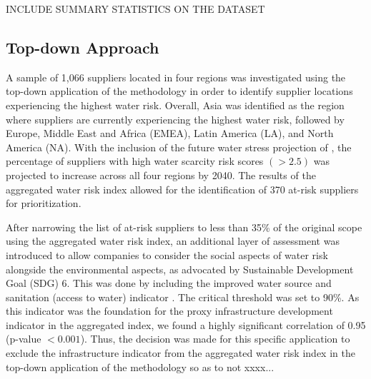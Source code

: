 \documentclass[a4paper]{article}
\begin{document}
 INCLUDE SUMMARY STATISTICS ON THE DATASET
 
\subsection{Top-down Approach}
A sample of 1,066 suppliers located in four regions was investigated using the top-down application of the methodology in order to identify supplier locations experiencing the highest water risk. 
Overall, Asia was identified as the region where suppliers are currently experiencing the highest water risk, followed by Europe, Middle East and Africa (EMEA), Latin America (LA), and North America (NA).
 With the inclusion of the future water stress projection of \citet{Luck:2015}, the percentage of suppliers with high water scarcity risk scores $(>2.5)$ was projected to increase across all four regions by 2040. 
 The results of the aggregated water risk index allowed for the identification of 370 at-risk suppliers for prioritization. 
 
After narrowing the list of at-risk suppliers to less than 35\% of the original scope using the aggregated water risk index, an additional layer of assessment was introduced to allow companies to consider the social aspects of water risk alongside the environmental aspects, as advocated by Sustainable Development Goal (SDG) 6.  
This was done by including the improved water source and sanitation (access to water) indicator \citep{WHO:2016}. 
The critical threshold was set to 90\%.  
As this indicator was the foundation for the proxy infrastructure development indicator in the aggregated index, we found a highly significant correlation of 0.95 (p-value $< 0.001$). 
Thus, the decision was made for this specific application to exclude the infrastructure indicator from the aggregated water risk index in the top-down application of the methodology so as to not xxxx...
\end{document}
